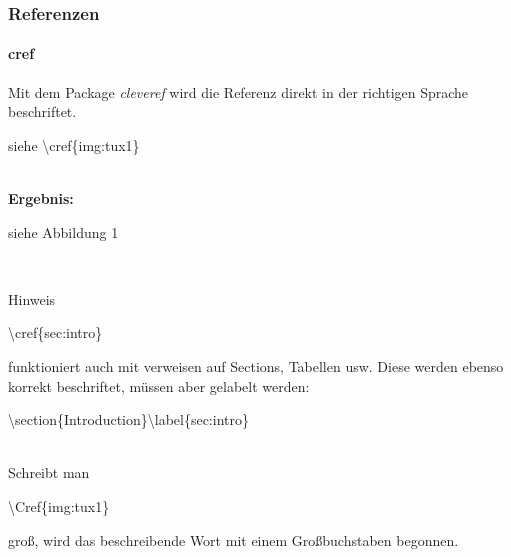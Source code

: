 \begin{frame}
\frametitle{Referenzen}
\framesubtitle{cref}

Mit dem Package \textit{cleveref} wird die Referenz direkt in der richtigen Sprache beschriftet.\\[3mm]

\begin{ttfamily}siehe 
\color{nounibaredI}\textbackslash cref\color{black}\{img:tux1\}\end{ttfamily}\\[3mm]
\textbf{Ergebnis:}\\[3mm]

\begin{rm}
siehe Abbildung 1 \end{rm}\\[3mm]

\medskip

\begin{block}{Hinweis}
\begin{ttfamily}\color{nounibaredI}\textbackslash cref\color{black}\{sec:intro\}\end{ttfamily} funktioniert auch mit verweisen auf Sections, Tabellen usw. Diese werden ebenso korrekt beschriftet, müssen aber gelabelt werden: \begin{ttfamily}\color{nounibaredI}\textbackslash section\color{black}\{Introduction\}\color{nounibaredI}\textbackslash label\color{black}\{sec:intro\}\end{ttfamily}\\[3mm] %
Schreibt man \begin{ttfamily}\color{nounibaredI}\textbackslash Cref\color{black}\{img:tux1\}\end{ttfamily} groß, wird das beschreibende Wort mit einem Großbuchstaben begonnen.
\end{block}

\end{frame}
